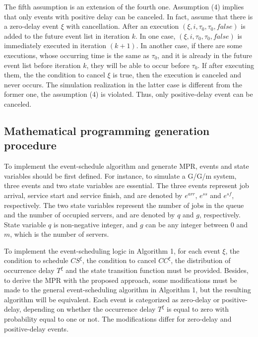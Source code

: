 \documentclass[]{interact}
\theoremstyle{plain}%
\theoremstyle{definition}
\theoremstyle{remark}
\begin{document}
The fifth assumption is an extension of the fourth one. Assumption (4) implies that only events with positive delay can be canceled. In fact, assume that there is a zero-delay event ${\xi}$ with cancellation. After an execution $(\xi,i,\tau_0,\tau_0,false)$ is added to the future event list in iteration $k$. In one case, $(\xi,i,\tau_0,\tau_0,false)$ is immediately executed in iteration $(k+1)$. In another case, if there are some executions, whose occurring time is the same as $\tau_0$, and it is already in the future event list before iteration $k$, they will be able to occur before $\tau_0$. If after executing them, the the condition to cancel $\xi$ is true, then the execution is canceled and never occurs. The simulation realization in the latter case is different from the former one, the assumption (4) is violated. Thus, only positive-delay event can be canceled.



\subsection{Mathematical programming generation procedure} \label{sec:MPR_procedure}

To implement the event-schedule algorithm and generate MPR, events and state variables should be first defined. For instance, to simulate a G/G/m system, three events and two state variables are essential. The three events represent job arrival, service start and service finish, and are denoted by $e^{arr}$, $e^{ss}$ and $e^{sf}$, respectively. The two state variables represent the number of jobs in the queue and the number of occupied servers, and are denoted by $q$ and $g$, respectively. State variable $q$ is non-negative integer, and $g$ can be any integer between $0$ and $m$, which is the number of servers. 

To implement the event-scheduling logic in Algorithm 1, for each event $\xi$, the condition to schedule $CS^{\xi}$, the condition to cancel $CC^{\xi}$, the distribution of occurrence delay $T^{\xi}$ %
and the state transition function must be provided. Besides, to derive the MPR with the proposed approach, some modifications must be made to the general event-scheduling algorithm in Algorithm 1, but the resulting algorithm will be equivalent. Each event is categorized as zero-delay or positive-delay, depending on whether the occurrence delay $T^{\xi}$ is equal to zero with probability equal to one or not. The modifications differ for zero-delay and positive-delay events. 
\end{document}
